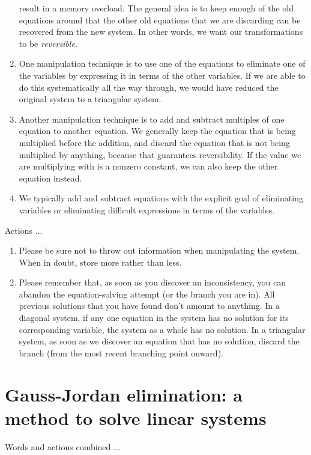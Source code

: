 \documentclass[10pt]{amsart}
\begin{document}
\begin{enumerate}
  result in a memory overload. The general idea is to keep enough of
  the old equations around that the other old equations that we are
  discarding can be recovered from the new system. In other words, we
  want our transformations to be {\em reversible}.
\item One manipulation technique is to use one of the equations to
  eliminate one of the variables by expressing it in terms of the
  other variables. If we are able to do this systematically all the
  way through, we would have reduced the original system to a
  triangular system.
\item Another manipulation technique is to add and subtract multiples
  of one equation to another equation. We generally keep the equation
  that is being multiplied before the addition, and discard the
  equation that is not being multiplied by anything, because that
  guarantees reversibility. If the value we are multiplying with is a
  nonzero constant, we can also keep the other equation instead.
\item We typically add and subtract equations with the explicit goal
  of eliminating variables or eliminating difficult expressions in
  terms of the variables.
\end{enumerate}

Actions ...

\begin{enumerate}
\item Please be sure not to throw out information when manipulating
  the system. When in doubt, store more rather than less.
\item Please remember that, as soon as you discover an inconsistency,
  you can abandon the equation-solving attempt (or the branch you are
  in). All previous solutions that you have found don't amount to
  anything. In a diagonal system, if any one equation in the system
  has no solution for its corresponding variable, the system as a
  whole has no solution. In a triangular system, as soon as we
  discover an equation that has no solution, discard the branch (from
  the most recent branching point onward).
\end{enumerate}

\section{Gauss-Jordan elimination: a method to solve linear systems}

Words and actions combined ...
\end{document}
